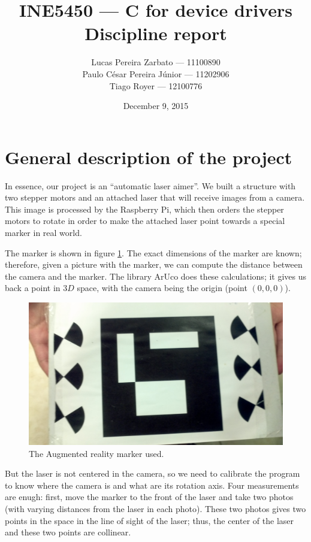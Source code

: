 \documentclass{article}
\begin{document}
\title{
    INE5450 --- C for device drivers \\
    Discipline report
}
\author{
    Lucas Pereira Zarbato --- 11100890 \\
    Paulo César Pereira Júnior --- 11202906 \\
    Tiago Royer --- 12100776
}
\date{December 9, 2015}
\maketitle

\section{General description of the project}

In essence, our project is an ``automatic laser aimer''.
We built a structure with two stepper motors and an attached laser
that will receive images from a camera.
This image is processed by the Raspberry Pi,
which then orders the stepper motors to rotate in order to
make the attached laser point towards a special marker in real world.

The marker is shown in figure \ref{fig:marker}.
The exact dimensions of the marker are known;
therefore, given a picture with the marker,
we can compute the distance between the camera and the marker.
The library ArUco does these calculations;
it gives us back a point in $3D$ space,
with the camera being the origin (point $(0, 0, 0)$).

\begin{figure}[h!]
    \includegraphics[scale=0.1]{imgs/marker.jpg}
    \caption{The Augmented reality marker used.}
    \label{fig:marker}
\end{figure}

But the laser is not centered in the camera,
so we need to calibrate the program to know where the camera is
and what are its rotation axis.
Four measurements are enugh:
first, move the marker to the front of the laser and take two photos
(with varying distances from the laser in each photo).
These two photos gives two points in the space
in the line of sight of the laser;
thus, the center of the laser and these two points are collinear.
\end{document}
